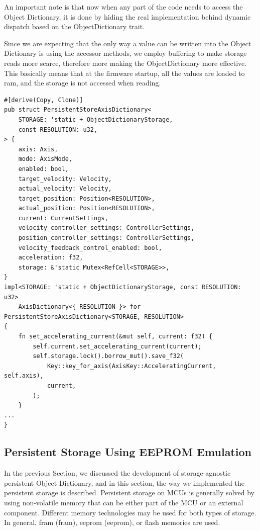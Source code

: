 An important note is that now when any part of the code needs to access the Object Dictionary, it is done by hiding the real implementation behind dynamic dispatch based on the ObjectDictionary trait.

Since we are expecting that the only way a value can be written into the Object Dictionary is using the accessor methods, we employ buffering to make storage reads more scarce, therefore more making the ObjectDictionary more effective.
This basically means that at the firmware startup, all the values are loaded to \acs{ram}, and the storage is not accessed when reading.

\newpage
\begin{lstlisting}[caption={Object Dictionary for persistently storing axis data.},label=lst:persistent_store_dict]
#[derive(Copy, Clone)]
pub struct PersistentStoreAxisDictionary<
    STORAGE: 'static + ObjectDictionaryStorage,
    const RESOLUTION: u32,
> {
    axis: Axis,
    mode: AxisMode,
    enabled: bool,
    target_velocity: Velocity,
    actual_velocity: Velocity,
    target_position: Position<RESOLUTION>,
    actual_position: Position<RESOLUTION>,
    current: CurrentSettings,
    velocity_controller_settings: ControllerSettings,
    position_controller_settings: ControllerSettings,
    velocity_feedback_control_enabled: bool,
    acceleration: f32,
    storage: &'static Mutex<RefCell<STORAGE>>,
}
impl<STORAGE: 'static + ObjectDictionaryStorage, const RESOLUTION: u32>
    AxisDictionary<{ RESOLUTION }> for PersistentStoreAxisDictionary<STORAGE, RESOLUTION>
{
    fn set_accelerating_current(&mut self, current: f32) {
        self.current.set_accelerating_current(current);
        self.storage.lock().borrow_mut().save_f32(
            Key::key_for_axis(AxisKey::AcceleratingCurrent, self.axis),
            current,
        );
    }
...
}
\end{lstlisting}

\subsection{Persistent Storage Using EEPROM Emulation}
\label{subsec:eeprom}
In the previous Section, we discussed the development of storage-agnostic persistent Object Dictionary, and in this section, the way we implemented the persistent storage is described.
Persistent storage on MCUs is generally solved by using non-volatile memory that can be either part of the MCU or an external component.
Different memory technologies may be used for both types of storage.
In general, \acs{fram} (\acl{fram}), \acs{eeprom} (\acl{eeprom}), or flash memories are used.

